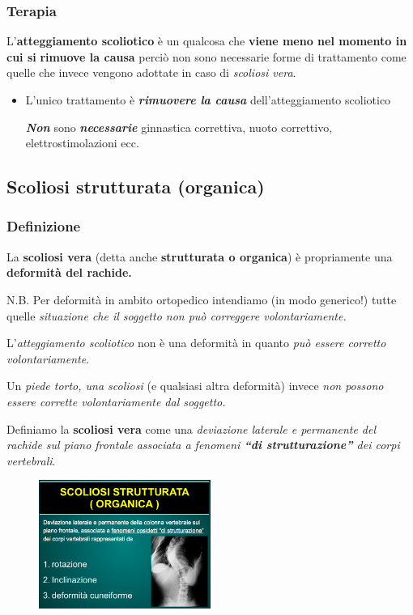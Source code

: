 \subsubsection{Terapia}


L'\textbf{atteggiamento scoliotico} è un qualcosa che \textbf{viene meno
nel momento in cui si} \textbf{rimuove la causa} perciò non sono
necessarie forme di trattamento come quelle che invece vengono adottate
in caso di \emph{scoliosi vera}.

\begin{itemize}
\item
  L'unico trattamento è \textbf{\emph{rimuovere la causa}}
  dell'atteggiamento scoliotico

  \textbf{\emph{Non}} sono \textbf{\emph{necessarie}} ginnastica
  correttiva, nuoto correttivo, elettrostimolazioni ecc.
\end{itemize}

\subsection{Scoliosi strutturata (organica)}

\subsubsection{Definizione}


La \textbf{scoliosi vera} (detta anche \textbf{strutturata o organica})
è propriamente una \textbf{deformità del rachide.}

N.B. Per deformità in ambito ortopedico intendiamo (in modo generico!)
tutte quelle \emph{situazione che il soggetto non può correggere
volontariamente.}

L'\emph{atteggiamento scoliotico} non è una deformità in quanto
\emph{può essere corretto volontariamente}.

Un \emph{piede torto, una scoliosi} (e qualsiasi altra deformità) invece
\emph{non possono essere corrette volontariamente dal soggetto.}

Definiamo la \textbf{scoliosi vera} come una \emph{deviazione laterale e
permanente del rachide sul piano frontale associata a fenomeni
\textbf{``di strutturazione''} dei corpi}
\emph{vertebrali}.

\begin{figure}[!ht]
\centering
	\includegraphics[width=0.5\textwidth]{012/image5.png}
\end{figure}

